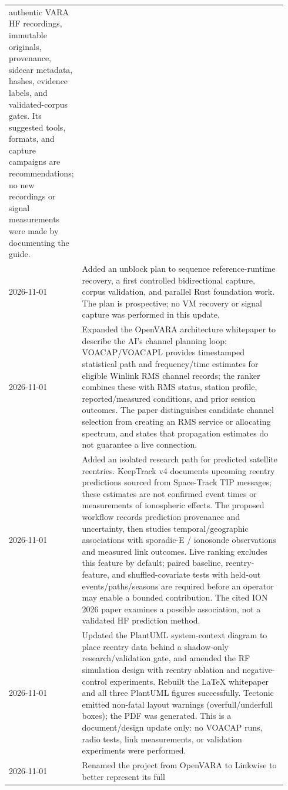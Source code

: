 \documentclass[11pt,a4paper]{article}
\begin{document}
\begin{longtable}{p{0.15\linewidth}p{0.79\linewidth}}
authentic VARA HF recordings, immutable originals, provenance, sidecar
metadata, hashes, evidence labels, and validated-corpus gates. Its suggested
tools, formats, and capture campaigns are recommendations; no new recordings
or signal measurements were made by documenting the guide. \\
2026-11-01 &
Added an unblock plan to sequence reference-runtime recovery, a first
controlled bidirectional capture, corpus validation, and parallel Rust
foundation work. The plan is prospective; no VM recovery or signal capture
was performed in this update. \\
2026-11-01 &
Expanded the OpenVARA architecture whitepaper to describe the AI's channel
planning loop: VOACAP/VOACAPL provides timestamped statistical path and
frequency/time estimates for eligible Winlink RMS channel records; the
ranker combines these with RMS status, station profile, reported/measured
conditions, and prior session outcomes. The paper distinguishes candidate
channel selection from creating an RMS service or allocating spectrum, and
states that propagation estimates do not guarantee a live connection. \\
2026-11-01 &
Added an isolated research path for predicted satellite reentries. KeepTrack
v4 documents upcoming reentry predictions sourced from Space-Track TIP
messages; these estimates are not confirmed event times or measurements of
ionospheric effects. The proposed workflow records prediction provenance and
uncertainty, then studies temporal/geographic associations with sporadic-E /
ionosonde observations and measured link outcomes. Live ranking excludes this
feature by default; paired baseline, reentry-feature, and shuffled-covariate
tests with held-out events/paths/seasons are required before an operator may
enable a bounded contribution. The cited ION 2026 paper examines a possible
association, not a validated HF prediction method. \\
2026-11-01 &
Updated the PlantUML system-context diagram to place reentry data behind a
shadow-only research/validation gate, and amended the RF simulation design
with reentry ablation and negative-control experiments. Rebuilt the LaTeX
whitepaper and all three PlantUML figures successfully. Tectonic emitted
non-fatal layout warnings (overfull/underfull boxes); the PDF was generated.
This is a document/design update only: no VOACAP runs, radio tests, link
measurements, or validation experiments were performed. \\
2026-11-01 &
Renamed the project from OpenVARA to Linkwise to better represent its full

\end{longtable}
\end{document}
